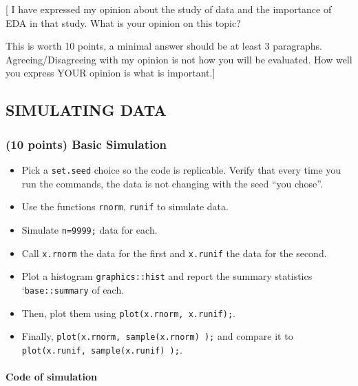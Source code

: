 \documentclass[
]{article}
\providecommand{\tightlist}{%
  \setlength{\itemsep}{0pt}\setlength{\parskip}{0pt}}
\begin{document}
{[} I have expressed my opinion about the study of data and the
importance of EDA in that study. What is your opinion on this topic?

This is worth 10 points, a minimal answer should be at least 3
paragraphs. Agreeing/Disagreeing with my opinion is not how you will be
evaluated. How well you express YOUR opinion is what is important.{]}

\hypertarget{simulating-data}{%
\subsection{SIMULATING DATA}\label{simulating-data}}

\hypertarget{points-basic-simulation}{%
\subsubsection{(10 points) Basic
Simulation}\label{points-basic-simulation}}

\begin{itemize}
\tightlist
\item
  Pick a \texttt{set.seed} choice so the code is replicable. Verify that
  every time you run the commands, the data is not changing with the
  seed ``you chose''.
\item
  Use the functions \texttt{rnorm}, \texttt{runif} to simulate data.\\
\item
  Simulate \texttt{n=9999;} data for each.\\
\item
  Call \texttt{x.rnorm} the data for the first and \texttt{x.runif} the
  data for the second.\\
\item
  Plot a histogram \texttt{graphics::hist} and report the summary
  statistics `\texttt{base::summary} of each.
\item
  Then, plot them using \texttt{plot(x.rnorm,\ x.runif);}.\\
\item
  Finally, \texttt{plot(x.rnorm,\ sample(x.rnorm)\ );} and compare it to
  \texttt{plot(x.runif,\ sample(x.runif)\ );}.
\end{itemize}

\hypertarget{code-of-simulation}{%
\paragraph{Code of simulation}\label{code-of-simulation}}
\end{document}
